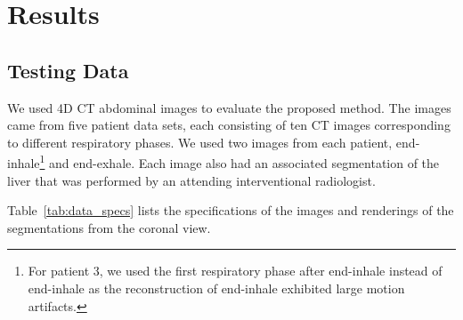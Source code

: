 \documentclass[]{spie}  %
\begin{document}
\section{Results}

\subsection{Testing Data}

We used 4D CT abdominal images to evaluate the proposed method. The images came from five patient data sets, each consisting of ten CT images corresponding to different respiratory phases. We used two images from each patient, end-inhale\footnote{For patient 3, we used the first respiratory phase after end-inhale instead of end-inhale as the reconstruction of end-inhale exhibited large motion artifacts.} and end-exhale. Each image also had an associated segmentation of the liver that was performed by an attending interventional radiologist.

Table~\ref{tab:data_specs} lists the specifications of the images and renderings of the segmentations from the coronal view.
\end{document}
